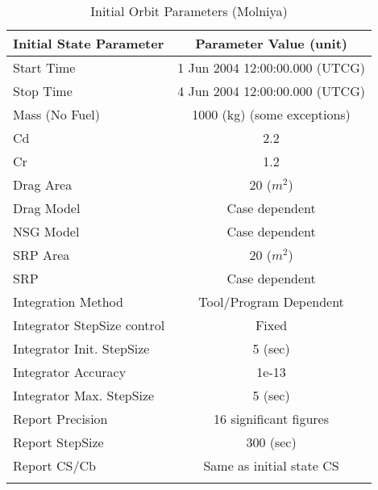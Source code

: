 \begin{table}[htbp!]
\centering \caption{Initial Orbit Parameters
(Molniya)}
      \begin{tabular}{lc}
      \hline\hline
            Initial State Parameter & Parameter Value (unit)\\
            \hline
            Start Time & 1 Jun 2004 12:00:00.000 (UTCG)\\
            Stop Time & 4 Jun 2004 12:00:00.000 (UTCG)\\
            
            Mass (No Fuel) & 1000 (kg) (some exceptions)\\
            Cd & 2.2\\
            Cr & 1.2\\
            Drag Area & 20 ($m^2$)\\
            Drag Model & Case dependent\\
            NSG Model & Case dependent\\
            SRP Area & 20 ($m^2$)\\
            SRP & Case dependent\\
            Integration Method & Tool/Program Dependent\\
            Integrator StepSize control & Fixed\\
            Integrator Init. StepSize & 5 (sec)\\
            Integrator Accuracy & 1e-13\\
            Integrator Max. StepSize & 5 (sec)\\
            Report Precision & 16 significant figures\\
            Report StepSize & 300 (sec)\\
            Report CS/Cb & Same as initial state CS\\
      \hline\hline
      \label{Table: InitStateMolniya}
\end{tabular}
\end{table}

